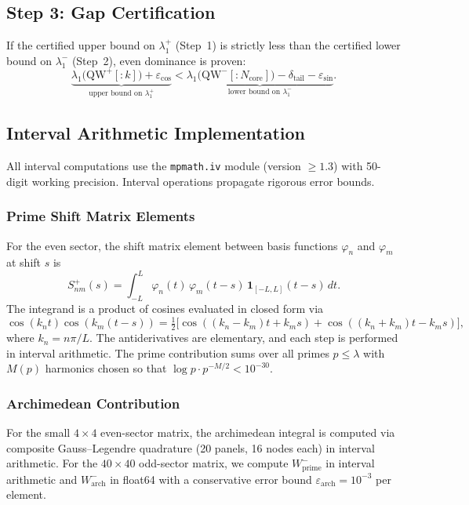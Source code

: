 \documentclass[12pt,a4paper]{article}
\theoremstyle{definition}
\theoremstyle{remark}
\begin{document}
\subsection{Step 3: Gap Certification}

If the certified upper bound on $\lambda_1^+$ (Step~1) is strictly less than the certified lower bound on $\lambda_1^-$ (Step~2), even dominance is proven:
\begin{equation}
\label{eq:gap-cert}
\underbrace{\lambda_1\bigl(\mathrm{QW}^+[{:}k]\bigr) + \varepsilon_{\mathrm{cos}}}_{\text{upper bound on } \lambda_1^+} < \underbrace{\lambda_1\bigl(\mathrm{QW}^-[{:}N_{\mathrm{core}}]\bigr) - \delta_{\mathrm{tail}} - \varepsilon_{\mathrm{sin}}}_{\text{lower bound on } \lambda_1^-}.
\end{equation}

\subsection{Interval Arithmetic Implementation}

All interval computations use the \texttt{mpmath.iv} module (version $\geq 1.3$) with 50-digit working precision. Interval operations propagate rigorous error bounds.

\subsubsection{Prime Shift Matrix Elements}

For the even sector, the shift matrix element between basis functions $\varphi_n$ and $\varphi_m$ at shift $s$ is
\[
S_{nm}^+(s) = \int_{-L}^{L} \varphi_n(t)\,\varphi_m(t-s)\,\mathbf{1}_{[-L,L]}(t-s)\,dt.
\]
The integrand is a product of cosines evaluated in closed form via
\[
\cos(k_n t)\cos(k_m(t-s)) = \tfrac{1}{2}\bigl[\cos((k_n - k_m)t + k_m s) + \cos((k_n + k_m)t - k_m s)\bigr],
\]
where $k_n = n\pi/L$. The antiderivatives are elementary, and each step is performed in interval arithmetic. The prime contribution sums over all primes $p \leq \lambda$ with $M(p)$ harmonics chosen so that $\log p \cdot p^{-M/2} < 10^{-30}$.

\subsubsection{Archimedean Contribution}

For the small $4 \times 4$ even-sector matrix, the archimedean integral is computed via composite Gauss--Legendre quadrature (20 panels, 16 nodes each) in interval arithmetic. For the $40 \times 40$ odd-sector matrix, we compute $W_{\mathrm{prime}}^-$ in interval arithmetic and $W_{\mathrm{arch}}^-$ in float64 with a conservative error bound $\varepsilon_{\mathrm{arch}} = 10^{-3}$ per element.
\end{document}
